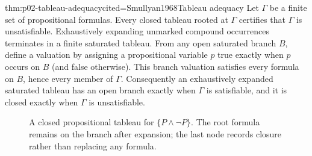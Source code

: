 \begin{hbtheorem}{thm:p02-tableau-adequacy}{cited=Smullyan1968}{Tableau adequacy}
Let \(\Gamma\) be a finite set of propositional formulas.  Every closed
tableau rooted at \(\Gamma\) certifies that \(\Gamma\) is unsatisfiable.
Exhaustively expanding unmarked compound occurrences terminates in a finite
saturated tableau.  From any open saturated branch \(B\), define a valuation
by assigning a propositional variable \(p\) true exactly when \(p\) occurs
on \(B\) (and false otherwise).  This branch valuation satisfies every
formula on \(B\), hence every member of \(\Gamma\).  Consequently an
exhaustively expanded saturated tableau has an open branch
exactly when \(\Gamma\) is satisfiable, and it is closed exactly when
\(\Gamma\) is unsatisfiable.
\end{hbtheorem}

\begin{figure}[htbp]
\centering
{}
\caption{A closed propositional tableau for
\(\{P\land\neg P\}\).  The root formula remains on the branch
after expansion; the last node records closure rather than replacing any
formula.}
\label{fig:p02-closed-tableau}
\end{figure}

